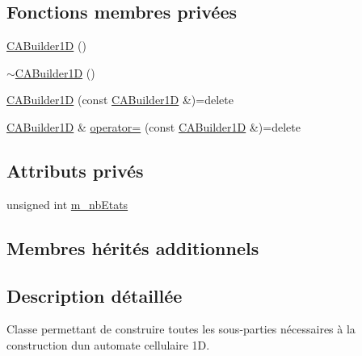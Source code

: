 \subsection*{Fonctions membres privées}
\begin{DoxyCompactItemize}
\item 
\mbox{\hyperlink{class_c_a_builder1_d_a8ce449e2418a22e39cf517baffde61de}{C\+A\+Builder1D}} ()
\item 
\mbox{\hyperlink{class_c_a_builder1_d_a376a4febba2304c52c1ac1c41c8a79a0}{$\sim$\+C\+A\+Builder1D}} ()
\item 
\mbox{\hyperlink{class_c_a_builder1_d_ae0dc5795982306cf2ce982cc2dc2eb22}{C\+A\+Builder1D}} (const \mbox{\hyperlink{class_c_a_builder1_d}{C\+A\+Builder1D}} \&)=delete
\item 
\mbox{\hyperlink{class_c_a_builder1_d}{C\+A\+Builder1D}} \& \mbox{\hyperlink{class_c_a_builder1_d_a3fdf59ff606ba76be957049bc52f79cf}{operator=}} (const \mbox{\hyperlink{class_c_a_builder1_d}{C\+A\+Builder1D}} \&)=delete
\end{DoxyCompactItemize}
\subsection*{Attributs privés}
\begin{DoxyCompactItemize}
\item 
unsigned int \mbox{\hyperlink{class_c_a_builder1_d_a50193db158de49187b1a377fcbff6250}{m\+\_\+nb\+Etats}}
\end{DoxyCompactItemize}
\subsection*{Membres hérités additionnels}


\subsection{Description détaillée}
Classe permettant de construire toutes les sous-\/parties nécessaires à la construction d\textquotesingle{}un automate cellulaire 1D. 

